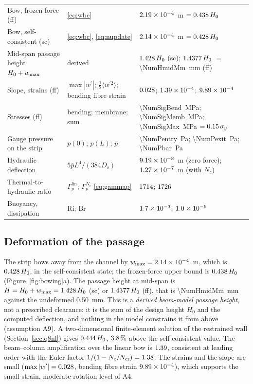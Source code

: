 \begin{table}[t]
\begin{tabular}{@{}p{4.4cm}p{4.6cm}p{4.9cm}@{}}
Bow, frozen force (ff) & \eqref{eq:wbc} & $2.19\times10^{-4}$~m $=0.438\,H_0$ \\
Bow, self-consistent (sc) & \eqref{eq:wbc}, \eqref{eq:nupdate} & $2.14\times10^{-4}$~m $=0.428\,H_0$ \\
Mid-span passage height $H_0+w_{\max}$ & derived & $1.428\,H_0$ (sc); $1.4377\,H_0$ $=$ \SI{\NumHmidMm}{\milli\metre} (ff) \\
Slope, strains (ff) & $\max|w^\prime|$; $\tfrac12\langle w^{\prime2}\rangle$; bending fibre strain & $0.028$; $1.39\times10^{-4}$; $9.89\times10^{-4}$ \\
Stresses (ff) & bending; membrane; sum & \SI{\NumSigBend}{\mega\pascal}; \SI{\NumSigMemb}{\mega\pascal}; \SI{\NumSigMax}{\mega\pascal} $=0.15\,\sigma_y$ \\
Gauge pressure on the strip & $p(0)$; $p(L)$; $\bar p$ & \SI{\NumPentry}{\pascal}; \SI{\NumPexit}{\pascal}; \SI{\NumPbar}{\pascal} \\
Hydraulic deflection & $5\bar pL^4/(384D_s)$ & $9.19\times10^{-8}$~m (zero force); $1.27\times10^{-7}$~m (with $N_c$) \\
Thermal-to-hydraulic ratio & $\Gamma_p^{\mathrm{lin}}$; $\Gamma_p^{N_c}$ \eqref{eq:gammap} & $1714$; $1726$ \\
Buoyancy, dissipation & $\mathrm{Ri}$; $\mathrm{Br}$ & $1.7\times10^{-3}$; $1.0\times10^{-6}$ \\
\bottomrule
\end{tabular}
\end{table}

\subsection{Deformation of the passage}
\label{sec:deform}
The strip bows away from the channel by $w_{\max}=2.14\times10^{-4}$~m, which is $0.428\,H_0$, in the
self-consistent state; the frozen-force upper bound is $0.438\,H_0$
(Figure~\ref{fig:bowing}a). The passage height at mid-span is $H=H_0+w_{\max}=1.428\,H_0$
(sc) or $1.4377\,H_0$ (ff), that is \SI{\NumHmidMm}{\milli\metre} against the undeformed
\SI{0.50}{\milli\metre}. This is a \emph{derived beam-model passage height}, not a prescribed
clearance: it is the sum of the design height $H_0$ and the computed deflection, and nothing in the
model constrains it from above (assumption A9). A two-dimensional finite-element solution of the restrained wall (Section~\ref{sec:q8nl}) gives
$0.444\,H_0$, $3.8\,\%$ above the self-consistent value.
The beam--column amplification over the linear bow
is $1.39$, consistent at leading order with the Euler factor $1/(1-N_c/N_{\mathrm{cr}})=1.38$.
The strains and the slope are small ($\max|w^\prime|=0.028$, bending fibre strain
$9.89\times10^{-4}$), which supports the small-strain, moderate-rotation level of A4.

